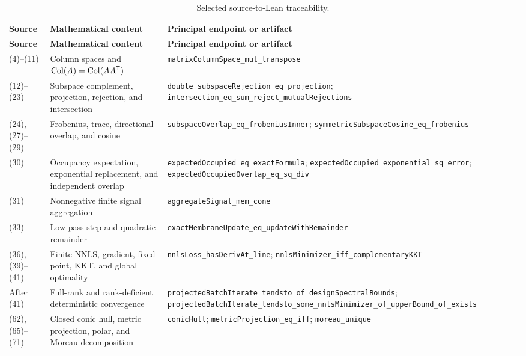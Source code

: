 \documentclass[11pt,a4paper]{article}
\begin{document}
\small
\begin{longtable}{@{}L{18mm}L{45mm}L{70mm}@{}}
\caption{Selected source-to-Lean traceability.}
\label{tab:endpoints}\\
\toprule
\textbf{Source} & \textbf{Mathematical content} & \textbf{Principal endpoint or artifact} \\
\midrule
\endfirsthead
\toprule
\textbf{Source} & \textbf{Mathematical content} & \textbf{Principal endpoint or artifact} \\
\midrule
\endhead
\bottomrule
\endfoot
(4)--(11) &
Column spaces and \(\operatorname{Col}(A)=\operatorname{Col}(AA^\mathsf{T})\) &
\nolinkurl{matrixColumnSpace_mul_transpose} \\

(12)--(23) &
Subspace complement, projection, rejection, and intersection &
\nolinkurl{double_subspaceRejection_eq_projection};
\nolinkurl{intersection_eq_sum_reject_mutualRejections} \\

(24), (27)--(29) &
Frobenius, trace, directional overlap, and cosine &
\nolinkurl{subspaceOverlap_eq_frobeniusInner};
\nolinkurl{symmetricSubspaceCosine_eq_frobenius} \\

(30) &
Occupancy expectation, exponential replacement, and independent overlap &
\nolinkurl{expectedOccupied_eq_exactFormula};
\nolinkurl{expectedOccupied_exponential_sq_error};
\nolinkurl{expectedOccupiedOverlap_eq_sq_div} \\

(31) &
Nonnegative finite signal aggregation &
\nolinkurl{aggregateSignal_mem_cone} \\

(33) &
Low-pass step and quadratic remainder &
\nolinkurl{exactMembraneUpdate_eq_updateWithRemainder} \\

(36), (39)--(41) &
Finite NNLS, gradient, fixed point, KKT, and global optimality &
\nolinkurl{nnlsLoss_hasDerivAt_line};
\nolinkurl{nnlsMinimizer_iff_complementaryKKT} \\

After (41) &
Full-rank and rank-deficient deterministic convergence &
\nolinkurl{projectedBatchIterate_tendsto_of_designSpectralBounds};
\nolinkurl{projectedBatchIterate_tendsto_some_nnlsMinimizer_of_upperBound_of_exists} \\

(62), (65)--(71) &
Closed conic hull, metric projection, polar, and Moreau decomposition &
\nolinkurl{conicHull}; \nolinkurl{metricProjection_eq_iff};
\nolinkurl{moreau_unique} \\


\end{longtable}
\end{document}
